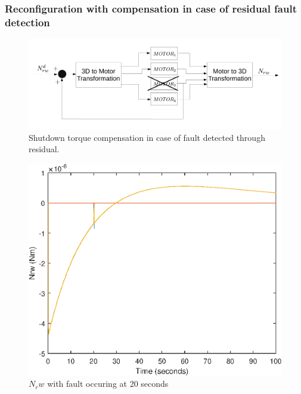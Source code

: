
\subsubsection{Reconfiguration with compensation in case of residual fault detection}

\begin{figure}
	\centering
	\includegraphics[width=120mm]{figures/residReconfigCompensation}
	\caption{Shutdown torque compensation in case of fault detected through residual.}
	\label{fig:angFaultCompensation}
\end{figure} 


\begin{figure}
	\centering
	\includegraphics[width=120mm]{figures/3dTorque_resid_reconfig}
	\caption{$N_rw$ with fault occuring at 20 seconds}
\end{figure} 

